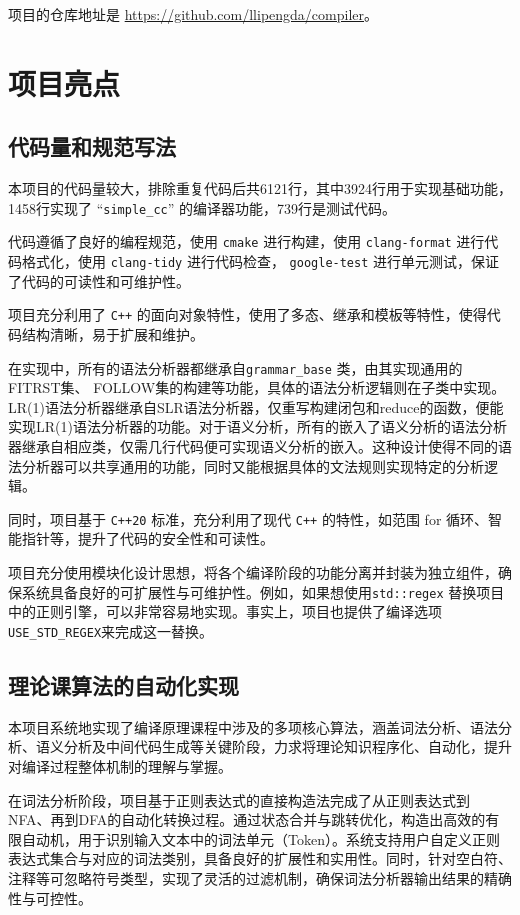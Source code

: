 \documentclass[a4paper]{article}
\begin{document}
项目的仓库地址是 \url{https://github.com/llipengda/compiler}。

\section{项目亮点}

\subsection{代码量和规范写法}

本项目的代码量较大，排除重复代码后共6121行，其中3924行用于实现基础功能，1458行实现了 ``\texttt{simple\_cc}'' 的编译器功能，739行是测试代码。

代码遵循了良好的编程规范，使用 \texttt{cmake} 进行构建，使用 \texttt{clang-format} 进行代码格式化，使用 \texttt{clang-tidy} 进行代码检查，
\texttt{google-test} 进行单元测试，保证了代码的可读性和可维护性。

项目充分利用了 \texttt{C++} 的面向对象特性，使用了多态、继承和模板等特性，使得代码结构清晰，易于扩展和维护。

在实现中，所有的语法分析器都继承自\texttt{grammar\_base} 类，由其实现通用的FITRST集、 FOLLOW集的构建等功能，具体的语法分析逻辑则在子类中实现。LR(1)语法分析器继承自SLR语法分析器，仅重写构建闭包和reduce的函数，便能实现LR(1)语法分析器的功能。对于语义分析，所有的嵌入了语义分析的语法分析器继承自相应类，仅需几行代码便可实现语义分析的嵌入。这种设计使得不同的语法分析器可以共享通用的功能，同时又能根据具体的文法规则实现特定的分析逻辑。


同时，项目基于 \texttt{C++20} 标准，充分利用了现代 \texttt{C++} 的特性，如范围 for 循环、智能指针等，提升了代码的安全性和可读性。

项目充分使用模块化设计思想，将各个编译阶段的功能分离并封装为独立组件，确保系统具备良好的可扩展性与可维护性。例如，如果想使用\texttt{std::regex} 替换项目中的正则引擎，可以非常容易地实现。事实上，项目也提供了编译选项 \texttt{USE\_STD\_REGEX}来完成这一替换。

\subsection{理论课算法的自动化实现}

本项目系统地实现了编译原理课程中涉及的多项核心算法，涵盖词法分析、语法分析、语义分析及中间代码生成等关键阶段，力求将理论知识程序化、自动化，提升对编译过程整体机制的理解与掌握。

在词法分析阶段，项目基于正则表达式的直接构造法完成了从正则表达式到NFA、再到DFA的自动化转换过程。通过状态合并与跳转优化，构造出高效的有限自动机，用于识别输入文本中的词法单元（Token）。系统支持用户自定义正则表达式集合与对应的词法类别，具备良好的扩展性和实用性。同时，针对空白符、注释等可忽略符号类型，实现了灵活的过滤机制，确保词法分析器输出结果的精确性与可控性。
\end{document}
